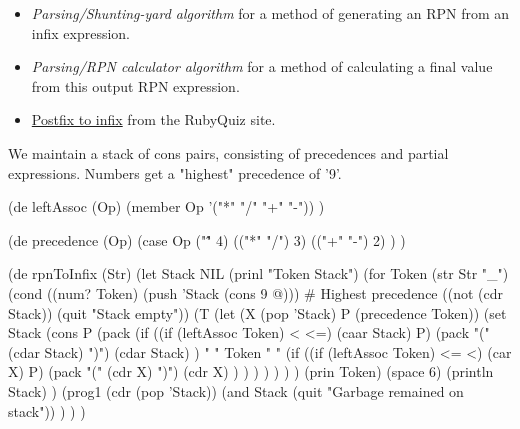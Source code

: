 \begin{itemize}
\item
  \emph{Parsing/Shunting-yard
  algorithm} for a method of generating an RPN from an infix expression.
\item
  \emph{Parsing/RPN calculator
  algorithm} for a method of calculating a final value from this output
  RPN expression.
\item
  \href{http://www.rubyquiz.com/quiz148.html}{Postfix to infix} from the
  RubyQuiz site.
\end{itemize}


\begin{wideverbatim}

We maintain a stack of cons pairs, consisting of precedences and partial
expressions. Numbers get a "highest" precedence of '9'.

(de leftAssoc (Op)
   (member Op '("*" "/" "+" "-")) )

(de precedence (Op)
   (case Op
      ("\^" 4)
      (("*" "/") 3)
      (("+" "-") 2) ) )

(de rpnToInfix (Str)
   (let Stack NIL
      (prinl "Token  Stack")
      (for Token (str Str "_")
         (cond
            ((num? Token) (push 'Stack (cons 9 @)))  # Highest precedence
            ((not (cdr Stack)) (quit "Stack empty"))
            (T
               (let (X (pop 'Stack)  P (precedence Token))
                  (set Stack
                     (cons P
                        (pack
                           (if ((if (leftAssoc Token) < <=) (caar Stack) P)
                              (pack "(" (cdar Stack) ")")
                              (cdar Stack) )
                           " " Token " "
                           (if ((if (leftAssoc Token) <= <) (car X) P)
                              (pack "(" (cdr X) ")")
                              (cdr X) ) ) ) ) ) ) )
         (prin Token)
         (space 6)
         (println Stack) )
      (prog1 (cdr (pop 'Stack))
         (and Stack (quit "Garbage remained on stack")) ) ) )

\end{wideverbatim}

